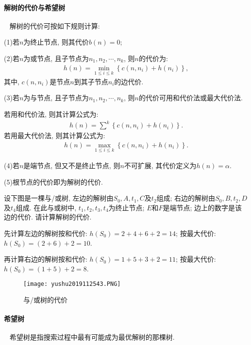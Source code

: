 \paragraph{解树的代价与希望树}~{}
解树的代价可按如下规则计算:

(1)若$n$为终止节点, 则其代价$b(n)=0$;

(2)若$n$为或节点, 且子节点为$n_1, n_2, \cdots ,n_k$, 则$n$的代价为:
    \begin{align}
      h(n)=\min _{1 \leq i \leq k}\left\{c\left(n, n_{i}\right)+h\left(n_{i}\right)\right\},
    \end{align}
其中, $c(n, n_i )$是节点$n$到其子节点$n_i$的边代价.

(3)若$n$为与节点, 且子节点为$n_1, n_2,\cdots,n_k$, 则$n$的代价可用和代价法或最大代价法.

    若用和代价法, 则其计算公式为:
    \begin{align}
      h(n)=\sum^{k}\left\{c\left(n, n_{i}\right)+h\left(n_{i}\right)\right\}.
    \end{align}
        若用最大代价法, 则其计算公式为:
    \begin{align}
      h(n)=\max _{1 \leq i \leq k}\left\{c\left(n, n_{i}\right)+h\left(n_{i}\right)\right\}.
    \end{align}

(4)若$n$是端节点, 但又不是终止节点, 则$n$不可扩展, 其代价定义为$h(n)=\alpha$.

(5)根节点的代价即为解树的代价.
\begin{example}
  设下图是一棵与/或树, 左边的解树由$S_0,A,t_1,C$及$t_2$组成; 右边的解树由$S_0,B,t_2,D$及$t_4$组成. 在此与或树中, $t_1,t_2,t_3,t_4$为终止节点; $E$和$F$是端节点; 边上的数字是该边的代价. 请计算解树的代价.
\end{example}
\begin{result}
先计算左边的解树按和代价: $h(S_0)=2+4+6+2=14$; 按最大代价: $h(S_0)=(2+6)+2=10$.

再计算右边的解树按和代价: $h(S_0)=1+5+3+2=11$; 按最大代价: $h(S_0)=(1+5)+2=8$.
\begin{figure}[H]
\centering
\texttt{[image: yushu2019112543.PNG]}
\caption{与/或树的代价}
\label{AI32fig43}
\end{figure}
\end{result}
\paragraph{希望树}~{}
希望树是指搜索过程中最有可能成为最优解树的那棵树.

